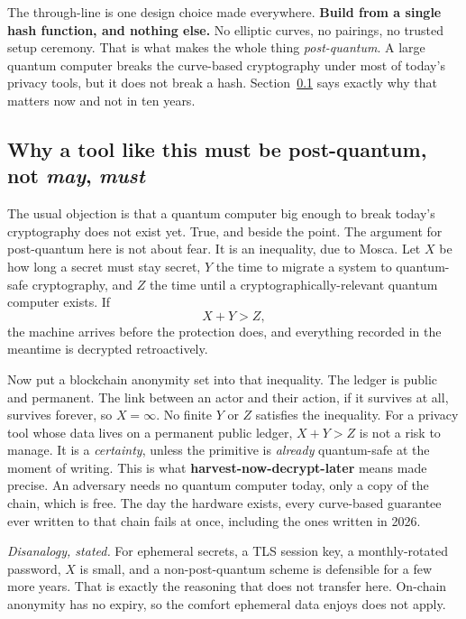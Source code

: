 \documentclass[11pt]{article}
\begin{document}
The through-line is one design choice made everywhere. \textbf{Build from a single hash
function, and nothing else.} No elliptic curves, no pairings, no trusted setup
ceremony. That is what makes the whole thing \emph{post-quantum}. A large quantum
computer breaks the curve-based cryptography under most of today's privacy tools, but
it does not break a hash. Section~\ref{sec:pq} says exactly why that matters now and not
in ten years.

\subsection{Why a tool like this must be post-quantum, not \emph{may}, \emph{must}}
\label{sec:pq}

The usual objection is that a quantum computer big enough to break today's cryptography
does not exist yet. True, and beside the point. The argument for post-quantum here is
not about fear. It is an inequality, due to Mosca. Let $X$ be how long a secret must
stay secret, $Y$ the time to migrate a system to quantum-safe cryptography, and $Z$ the
time until a cryptographically-relevant quantum computer exists. If
\[ X + Y > Z, \]
the machine arrives before the protection does, and everything recorded in the meantime
is decrypted retroactively.

Now put a blockchain anonymity set into that inequality. The ledger is public and
permanent. The link between an actor and their action, if it survives at all, survives
forever, so $X = \infty$. No finite $Y$ or $Z$ satisfies the inequality. For a privacy
tool whose data lives on a permanent public ledger, $X + Y > Z$ is not a risk to
manage. It is a \emph{certainty}, unless the primitive is \emph{already} quantum-safe at
the moment of writing. This is what \textbf{harvest-now-decrypt-later} means made
precise. An adversary needs no quantum computer today, only a copy of the chain, which
is free. The day the hardware exists, every curve-based guarantee ever written to that
chain fails at once, including the ones written in 2026.

\emph{Disanalogy, stated.} For ephemeral secrets, a TLS session key, a monthly-rotated
password, $X$ is small, and a non-post-quantum scheme is defensible for a few more
years. That is exactly the reasoning that does not transfer here. On-chain anonymity has
no expiry, so the comfort ephemeral data enjoys does not apply.
\end{document}
